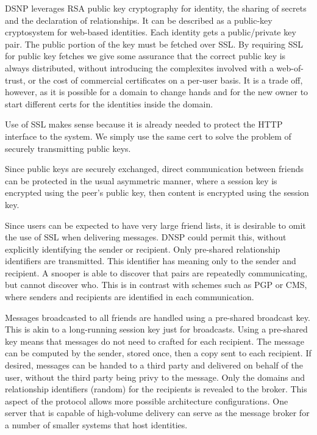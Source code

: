 \documentclass[letterpaper,11pt,oneside]{article}
\begin{document}
DSNP leverages RSA public key cryptography for identity, the sharing of secrets
and the declaration of relationships. It can be described as a public-key
cryptosystem for web-based identities. Each identity gets a public/private key
pair. The public portion of the key must be fetched over SSL. By requiring SSL
for public key fetches we give some assurance that the correct public key is
always distributed, without introducing the complexites involved with a
web-of-trust, or the cost of commercial certificates on a per-user basis. It is
a trade off, however, as it is possible for a domain to change hands and for
the new owner to start different certs for the identities inside the domain.

Use of SSL makes sense because it is already needed to protect the HTTP
interface to the system. We simply use the same cert to solve the problem of
securely transmitting public keys.

Since public keys are securely exchanged, direct communication between friends
can be protected in the usual asymmetric manner, where a session key is
encrypted using the peer's public key, then content is encrypted using the
session key.

Since users can be expected to have very large friend lists, it is desirable to
omit the use of SSL when delivering messages. DNSP could permit this, without
explicitly identifying the sender or recipient. Only pre-shared relationship
identifiers are transmitted. This identifier has meaning only to the sender and
recipient. A snooper is able to discover that pairs are repeatedly
communicating, but cannot discover who. This is in contrast with schemes such
as PGP or CMS, where senders and recipients are identified in each
communication.

Messages broadcasted to all friends are handled using a pre-shared broadcast
key. This is akin to a long-running session key just for broadcasts. Using a
pre-shared key means that messages do not need to crafted for each recipient.
The message can be computed by the sender, stored once, then a copy sent to
each recipient. If desired, messages can be handed to a third party and
delivered on behalf of the user, without the third party being privy to the
message. Only the domains and relationship identifiers (random) for the
recipients is revealed to the broker. This aspect of the protocol allows more
possible architecture configurations. One server that is capable of high-volume
delivery can serve as the message broker for a number of smaller systems that
host identities.
\end{document}
